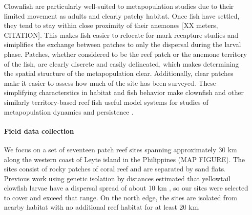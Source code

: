 \documentclass[12pt, oneside]{article}   	%
\begin{document}

Clownfish are particularly well-suited to metapopulation studies due to their limited movement as adults and clearly patchy habitat. Once fish have settled, they tend to stay within close proximity of their anemones [XX meters, CITATION]. This makes fish easier to relocate for mark-recapture studies and simiplifies the exchange between patches to only the dispersal during the larval phase. Patches, whether considered to be the reef patch or the anemone territory of the fish, are clearly discrete and easily delineated, which makes determining the spatial structure of the metapopulation clear. Additionally, clear patches make it easier to assess how much of the site has been surveyed. These simplifying characterstics in habitat and fish behavior make clownfish and other similarly territory-based reef fish useful model systems for studies of metapopulation dynamics and persistence \citep[e.g.][]{buston2013marine, salles_coral_2015, johnson2018integrating}.

\paragraph*{Field data collection}

We focus on a set of seventeen patch reef sites spanning approximately 30 km along the western coast of Leyte island in the Philippines (MAP FIGURE). The sites consist of rocky patches of coral reef and are separated by sand flats. Previous work using genetic isolation by distances estimated that yellowtail clowfish larvae have a dispersal spread of about 10 km \citep[range 4-27 km,][]{pinsky2010using}, so our sites were selected to cover and exceed that range. On the north edge, the sites are isolated from nearby habitat with no additional reef habitat for at least 20 km. %
\end{document}

